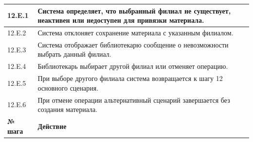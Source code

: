 \documentclass[12pt,a4paper]{article}
\begin{document}
\begin{xltabular}{\textwidth}{
				|>{\raggedright\arraybackslash}p{2.7cm}
				|>{\raggedright\arraybackslash}X|
			}
			12.E.1 & Система определяет, что выбранный филиал не существует, неактивен или
			недоступен для привязки материала. \\
			\hline
			12.E.2 & Система отклоняет сохранение материала с указанным филиалом. \\
			\hline
			12.E.3 & Система отображает библиотекарю сообщение о невозможности выбрать
			данный филиал. \\
			\hline
			12.E.4 & Библиотекарь выбирает другой филиал или отменяет операцию. \\
			\hline
			12.E.5 & При выборе другого филиала система возвращается к шагу 12 основного
			сценария. \\
			\hline
			12.E.6 & При отмене операции альтернативный сценарий завершается без создания
			материала. \\
			\hline
			
			
			\textbf{№ шага} & \textbf{Действие} \\
			\hline
			

\end{xltabular}
\end{document}
